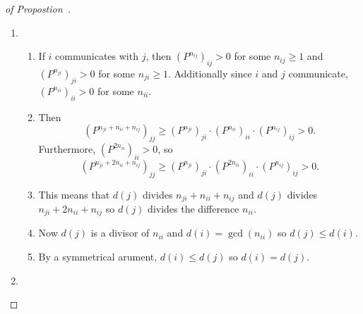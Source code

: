 \documentclass[12pt]{article}
\begin{document}
\begin{proof}[of Propostion~\ref
    {prop:stationarydistributions:communicating}]
    \begin{enumerate}
        \item
            \begin{enumerate}
                \item
                    If \( i \) communicates with \( j \), then \( (P^{n_
                    {ij}})_{ij} > 0 \) for some \( n_{ij} \ge 1 \) and \(
                    (P^{n_{ji}})_{ji} > 0 \) for some \( n_{ji} \ge 1 \).
                    Additionally since \( i \) and \( j \) communicate, \(
                    (P^{n_{ii}})_{ii} > 0 \) for some \( n_{ii} \).
                \item
                    Then
                    \[
                        (P^{n_{ji} + n_{ii} + n_{ij}})_{jj} \ge (P^{n_{ji}})_
                        {ji} \cdot (P^{n_{ii}})_{ii} \cdot (P^{n_{ij}})_
                        {ij} > 0.
                    \] Furthermore, \( (P^{2n_{ii}})_{ii} > 0 \), so
                    \[
                        (P^{n_{ji} + 2n_{ii} + n_{ij}})_{jj} \ge (P^{n_{ji}})_
                        {ji} \cdot (P^{2n_{ii}})_{ii} \cdot (P^{n_{ij}})_
                        {ij} > 0.
                    \]
                \item
                    This means that \( d(j) \) divides \( n_{ji} + n_{ii}
                    + n_{ij} \) and \( d(j) \) divides \( n_{ji} + 2n_{ii}
                    + n_{ij} \) so \( d(j) \) divides the difference \(
                    n_{ii} \).
                \item
                    Now \( d(j) \) is a divisor of \( n_{ii} \) and \( d
                    (i) = \gcd(n_{ii}) \) so \( d(j) \le d(i) \).
                \item
                    By a symmetrical arument, \( d(i) \le d(j) \) so \(
                    d(i) = d(j) \).
            \end{enumerate}
        \item
\end{enumerate}
\end{proof}
\end{document}
